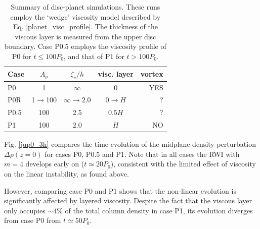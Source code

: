 \begin{table}
  \centering
  \caption{Summary of disc-planet simulations. These runs employ the
    `wedge' viscosity model described by
    Eq. \ref{planet_visc_profile}. The thickness of the viscous layer
    is measured from the upper disc boundary. Case P0.5 employs the
    viscosity profile of P0 for $t\leq100P_0$, and that of P1 for 
    $t>100P_0$.\label{planet_sims}}
    \begin{tabular}{lcccr}
      \hline\hline
      Case & $A_\nu$ &$\zeta_\nu/h$ & visc. layer& vortex \\ 
      \hline
      P0      &    1     &    $\infty$      & 0     &   YES    \\
      P0R    &    1$\to$100 & $\infty\to2.0$ &$0\to H$  & ?  \\
      P0.5    &    100 & 2.5 &$0.5H$ &  ?           \\ 
      P1      &    100   &    2.0      & $H$    &  NO    \\ 
      \hline
  \end{tabular}
\end{table}



Fig. \ref{jup0_3h} compares the time evolution of the midplane density
perturbation $\Delta\rho(z=0)$ for cases P0, P0.5 and P1. Note that in 
all cases the RWI with $m=4$ develops early on ($t\simeq20P_0$),
consistent with the limited effect of viscosity on the linear
instability, as found above. 

However, comparing case P0 and P1 shows that the non-linear evolution
is significantly affected by layered viscosity. Despite the fact that
the viscous layer only occupies $\sim4\%$ of the total column density
in case P1, its evolution diverges from case P0 from $t\simeq50P_0$.  



